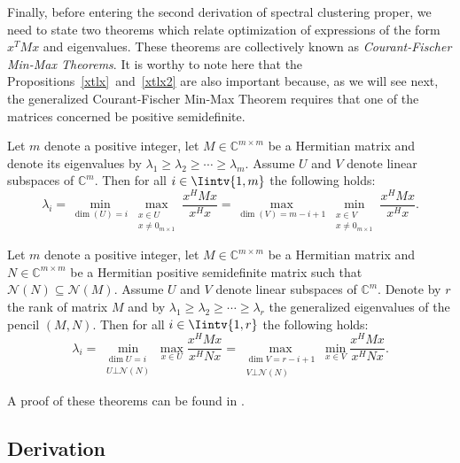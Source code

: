 Finally, before entering the second derivation of spectral clustering proper, we need to state two theorems which relate optimization of expressions of the form $x^TMx$ and eigenvalues.
These theorems are collectively known as \textit{Courant-Fischer Min-Max Theorems}.
   It is worthy to note here that the Propositions~\ref{xtlx}~and~\vref{xtlx2} are also important because, as we will see next, the generalized Courant-Fischer Min-Max Theorem requires that one of the matrices concerned be positive semidefinite. 

\begin{theorem} \label{minmax1}
   Let $m$ denote a positive integer, let $M \in \mathbb{C}^{m \times m}$ be a Hermitian matrix and denote its eigenvalues by $\lambda_1 \ge \lambda_2 \ge \cdots \ge \lambda_m$. 
   Assume $U$ and $V$ denote linear subspaces of $\mathbb C^{m }$.
   Then for all $i \in \Iintv{1,m}$ the following holds:
\begin{equation}
   \lambda_i = \min_{\dim (U) = i} \max_{\substack{x \in U \\ x \ne 0_{m \times 1}}} \frac{x^HMx}{x^Hx} = \max_{\dim (V) = m-i+1} \min_{\substack{x \in V \\ x \ne 0_{m \times 1}}} \frac{x^HMx}{x^Hx}.
\end{equation}
\end{theorem}

\begin{theorem} \label{minmax2}
   Let $m$ denote a positive integer, let $M \in \mathbb {C} ^{m \times m}$ be a Hermitian matrix and $N \in \mathbb C ^{m \times m}$ be a Hermitian positive semidefinite matrix such that $\mathcal N (N)  \subseteq \mathcal N (M)$.
   Assume $U$ and $V$ denote linear subspaces of $\mathbb C^{m }$.
   Denote by $r$ the rank of matrix $M$ and by $\lambda_1 \ge \lambda_2 \ge \cdots \ge \lambda_r$ the generalized eigenvalues of the pencil $(M,N)$.
   Then for all $i \in \Iintv{1,r}$ the following holds:
   \begin{equation}
      \lambda_i = \min_{\substack{ \dim U = i \\ U \bot \mathcal N (N)}} \max_{x \in U} \frac{x^HMx}{x^HNx} = \max_{\substack{\dim  V = r - i + 1 \\ V \bot \mathcal N (N)}} \min_{x \in V} \frac{x^HMx}{x^HNx}.
   \end{equation}
\end{theorem}

A proof of these theorems can be found in \cite{minmax}.

\subsection{Derivation}

